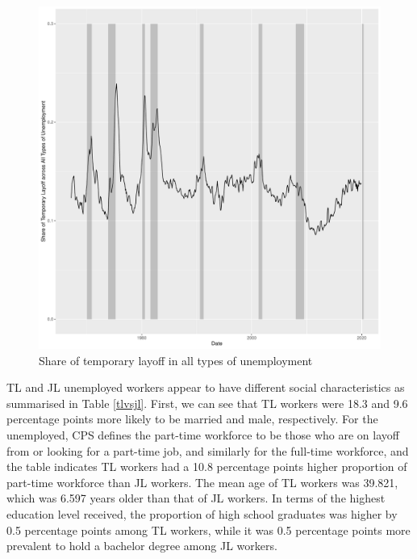 \documentclass[a4paper, 11pt, tikz]{article}
\begin{document}
\begin{figure}
  \centering
  \includegraphics[width=150mm]{TL_share_out_of_U.pdf}
  \caption{Share of temporary layoff in all types of unemployment}
  \label{TL_share_out_of_U}
\end{figure}

TL and JL unemployed workers appear to have different social characteristics as summarised in Table \ref{tlvsjl}.
First, we can see that TL workers were 18.3 and 9.6 percentage points more likely to be married and male, respectively.
For the unemployed, CPS defines the part-time workforce to be those who are on layoff from or looking for a part-time job, and similarly for the full-time workforce, and the table indicates TL workers had a 10.8 percentage points higher proportion of part-time workforce than JL workers.
The mean age of TL workers was 39.821, which was 6.597 years older than that of JL workers.
In terms of the highest education level received, the proportion of high school graduates was higher by 0.5 percentage points among TL workers, while it was 0.5 percentage points more prevalent to hold a bachelor degree among JL workers.
\end{document}
